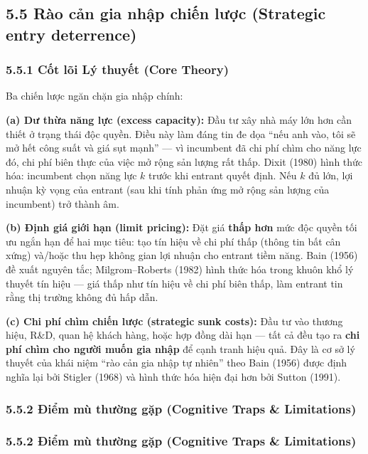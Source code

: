 \documentclass[
]{article}
\begin{document}
\subsection{5.5 Rào cản gia nhập chiến lược (Strategic entry
deterrence)}\label{ruxe0o-cux1ea3n-gia-nhux1eadp-chiux1ebfn-lux1b0ux1ee3c-strategic-entry-deterrence}

\subsubsection{5.5.1 Cốt lõi Lý thuyết (Core
Theory)}\label{cux1ed1t-luxf5i-luxfd-thuyux1ebft-core-theory-5}

Ba chiến lược ngăn chặn gia nhập chính:

\textbf{(a) Dư thừa năng lực (excess capacity):} Đầu tư xây nhà máy lớn
hơn cần thiết ở trạng thái độc quyền. Điều này làm đáng tin đe dọa ``nếu
anh vào, tôi sẽ mở hết công suất và giá sụt mạnh'' --- vì incumbent đã
chi phí chìm cho năng lực đó, chi phí biên thực của việc mở rộng sản
lượng rất thấp. Dixit (1980) hình thức hóa: incumbent chọn năng lực
\(k\) trước khi entrant quyết định. Nếu \(k\) đủ lớn, lợi nhuận kỳ vọng
của entrant (sau khi tính phản ứng mở rộng sản lượng của incumbent) trở
thành âm.

\textbf{(b) Định giá giới hạn (limit pricing):} Đặt giá \textbf{thấp
hơn} mức độc quyền tối ưu ngắn hạn để hai mục tiêu: tạo tín hiệu về chi
phí thấp (thông tin bất cân xứng) và/hoặc thu hẹp không gian lợi nhuận
cho entrant tiềm năng. Bain (1956) đề xuất nguyên tắc; Milgrom--Roberts
(1982) hình thức hóa trong khuôn khổ lý thuyết tín hiệu --- giá thấp như
tín hiệu về chi phí biên thấp, làm entrant tin rằng thị trường không đủ
hấp dẫn.

\textbf{(c) Chi phí chìm chiến lược (strategic sunk costs):} Đầu tư vào
thương hiệu, R\&D, quan hệ khách hàng, hoặc hợp đồng dài hạn --- tất cả
đều tạo ra \textbf{chi phí chìm cho người muốn gia nhập} để cạnh tranh
hiệu quả. Đây là cơ sở lý thuyết của khái niệm ``rào cản gia nhập tự
nhiên'' theo Bain (1956) được định nghĩa lại bởi Stigler (1968) và hình
thức hóa hiện đại hơn bởi Sutton (1991).

\subsubsection{5.5.2 Điểm mù thường gặp (Cognitive Traps \&
Limitations)}\label{ux111iux1ec3m-muxf9-thux1b0ux1eddng-gux1eb7p-cognitive-traps-limitations-9}

\subsubsection{5.5.2 Điểm mù thường gặp (Cognitive Traps \&
Limitations)}\label{ux111iux1ec3m-muxf9-thux1b0ux1eddng-gux1eb7p-cognitive-traps-limitations-10}
\end{document}
